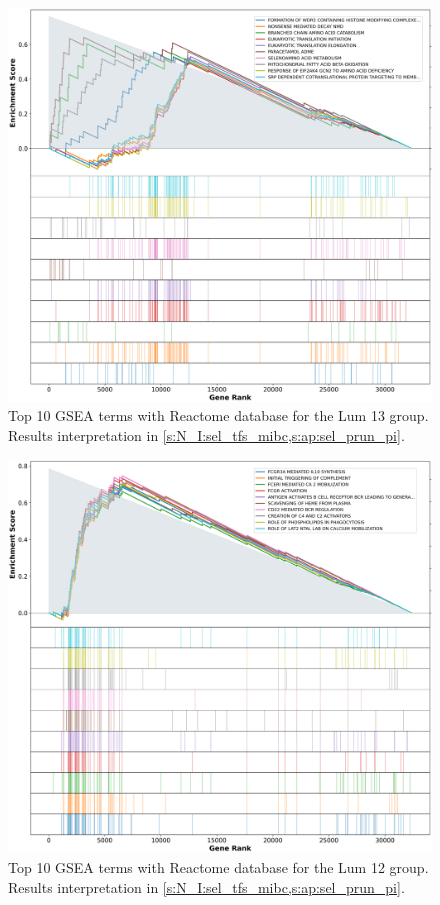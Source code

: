 \begin{figure}[!htb]
    \centering
    \includegraphics[width=\textwidth,keepaspectratio]{Sections/Network_I/Resources/selective_pruning/gsea/largeLuminal_10_top_manTerms.png}
    \caption[Lum 13: GSEA top 10 Reactome terms]{Top 10 GSEA terms with Reactome database for the Lum 13 group. Results interpretation in \cref{s:N_I:sel_tfs_mibc,s:ap:sel_prun_pi}.}
    \label{fig:ap:gsea_largeLuminal}
\end{figure}

\begin{figure}[!htb]
    \centering
    \includegraphics[width=\textwidth,keepaspectratio]{Sections/Network_I/Resources/selective_pruning/gsea/lumInf_10_top_manTerms.png}
    \caption[Lum 12: GSEA top 10 Reactome terms]{Top 10 GSEA terms with Reactome database for the Lum 12 group. Results interpretation in \cref{s:N_I:sel_tfs_mibc,s:ap:sel_prun_pi}.}
    \label{fig:ap:gsea_lumInf}
\end{figure}


